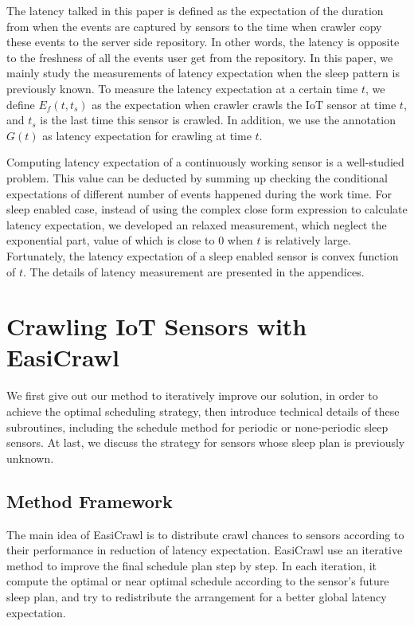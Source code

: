 \documentclass[conference]{IEEEtran}
\begin{document}
The latency talked in this paper is defined as the expectation of the duration from when the events are captured by sensors to the time when crawler copy these events to the server side repository. In other words, the latency is opposite to the freshness of all the events user get from the repository.
In this paper, we mainly study the measurements of latency expectation when the sleep pattern is previously known.
To measure the latency expectation at a certain time $t$, we define $E_f(t, t_s)$ as the expectation when crawler crawls the IoT sensor at time $t$, and $t_s$ is the last time this sensor is crawled. In addition, we use the annotation $G(t)$ as latency expectation for crawling at time $t$.

Computing latency expectation of a continuously working sensor is a well-studied problem\cite{Cho2000, Wolf2002}. 
This value can be deducted by summing up checking the conditional expectations of different number of events happened during the work time. 
For sleep enabled case, instead of using the complex close form expression to calculate latency expectation, we developed an relaxed measurement, which neglect the exponential part, value of which is close to $0$ when $t$ is relatively large. Fortunately, the latency expectation of a sleep enabled sensor is convex function of $t$.
The details of latency measurement are presented in the appendices. 

\section{Crawling IoT Sensors with EasiCrawl} \label{easicrawl}

We first give out our method to iteratively improve our solution, in order to achieve the optimal scheduling strategy, then introduce technical details of these subroutines, including the schedule method for periodic or none-periodic sleep sensors. At last, we discuss the strategy for sensors whose sleep plan is previously unknown.

\subsection{Method Framework}
The main idea of EasiCrawl is to distribute crawl chances to sensors according to their performance in reduction of latency expectation.
EasiCrawl use an iterative method to improve the final schedule plan step by step. 
In each iteration, it compute the optimal or near optimal schedule according to the sensor's future sleep plan, and try to redistribute the arrangement for a better global latency expectation.
\end{document}
